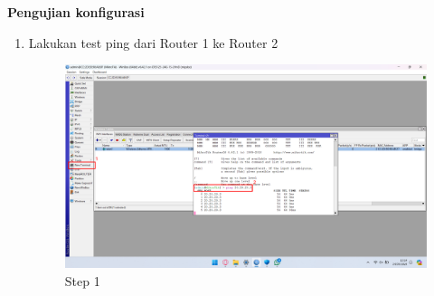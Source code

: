 \begin{center}
	\textbf{Pengujian konfigurasi}
	\begin{enumerate}
	\item Lakukan test ping dari Router 1 ke Router 2
	\begin{figure}[H]
		\centering
		\includegraphics[width=0.9\linewidth]{P1/img/per1/pc1/Step 4.png}
		\caption{Step 1}
		\label{fig:Ping Step 1(Per.1 PC1)}
	\end{figure}
	\end{enumerate}
\end{center}

